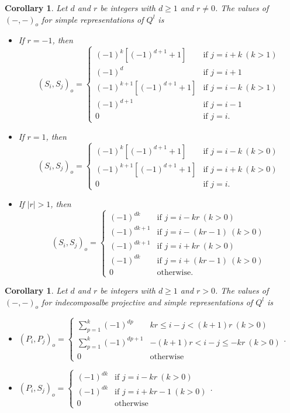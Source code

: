 \documentclass[reqno,12pt,a4paper]{amsart}
\newtheorem{corollary}[theorem]{Corollary}
\theoremstyle{remark}
\theoremstyle{definition}
\numberwithin{equation}{section}
\begin{document}
\begin{corollary}
\label{cor:antisymmetric-orbital-Euler-form-linear}
Let $d$ and $r$ be integers with $d\geq 1$ and $r\neq 0$.
The values of $(-,-)_o$ for simple representations of $Q^{l}$ is
\begin{itemize}
\item[(1)] If $r=-1$, then
    \[
    (S_i,S_j)_o=\begin{cases}
    (-1)^{k}[(-1)^{d+1}+1] & \text{if }j=i+k~(k>1)\\
    (-1)^{d} & \text{if } j=i+1\\
    (-1)^{k+1}[(-1)^{d+1}+1] & \text{if }j=i-k~(k>1)\\
    (-1)^{d+1} & \text{if } j=i-1\\
    0 & \text{if } j=i.
    \end{cases}
    \]
\item[(2)] If $r=1$, then
    \[
    (S_i,S_j)_o=\begin{cases}
    (-1)^{k}[(-1)^{d+1}+1] & \text{if }j=i-k~(k>0)\\
    (-1)^{k+1}[(-1)^{d+1}+1] & \text{if }j=i+k~(k>0)\\
    0 & \text{if } j=i.
    \end{cases}
    \]
    \item[(3)] If $|r|>1$, then
\[
    (S_i,S_j)_o=\begin{cases}
    (-1)^{dk} & \text{if }j=i-kr~(k>0)\\
    (-1)^{dk+1} & \text{if } j=i-(kr-1)~(k>0)\\
    (-1)^{dk+1} & \text{if }j=i+kr~(k>0)\\
    (-1)^{dk} & \text{if } j=i+(kr-1)~(k>0)\\
    0 & \text{otherwise}.
    \end{cases}
    \]
\end{itemize}
\end{corollary}

\begin{corollary}
	\label{cor:antisymmetric-orbital-Euler-form-linear-projectives}
	Let $d$ and $r$ be integers with $d\geq 1$ and $r > 0$.
	The values of $(-,-)_o$ for indecomposalbe projective and simple representations of $Q^{l}$ is
	\begin{itemize}
		\item[(1)] $
		(P_i,P_j)_o=\begin{cases}
			\sum\limits_{p=1}^{k}(-1)^{dp} & kr\leq i-j<(k+1)r~(k>0)\\
			\sum\limits_{p=1}^{k}(-1)^{dp+1} & -(k+1)r<i-j \leq -kr~(k>0)\\ 0 &\text{otherwise}\end{cases}.$
		\item[(2)] $
		(P_i,S_j)_o=\begin{cases}
			(-1)^{dk} & \text{if }j=i-kr~(k>0)\\
			(-1)^{dk} & \text{if }j=i+kr-1~(k>0)\\
			0 & \text{otherwise}
		\end{cases}$.
	\end{itemize}
\end{corollary}
\end{document}
